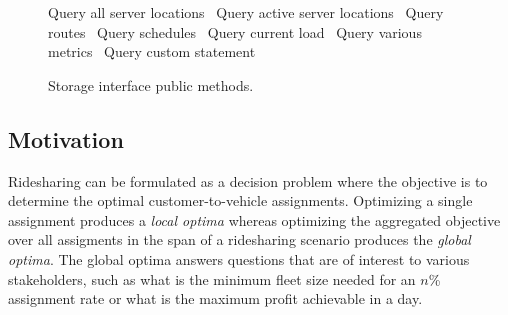 \documentclass{article}
\def\nwendcode{\endtrivlist \endgroup}
\let\nwdocspar=\par
\theoremstyle{definition}
\begin{document}
\begin{figure}
{\begin{minipage}[t]{0.40\textwidth}
\LA{}Query all server locations~{\nwtagstyle{}}\RA{}
\LA{}Query active server locations~{\nwtagstyle{}}\RA{}
\LA{}Query routes~{\nwtagstyle{}}\RA{}
\LA{}Query schedules~{\nwtagstyle{}}\RA{}
\LA{}Query current load~{\nwtagstyle{}}\RA{}
\LA{}Query various metrics~{\nwtagstyle{}}\RA{}
\LA{}Query custom statement~{\nwtagstyle{}}\RA{}
\nwendcode{}\nwdocspar
\end{minipage}
}
\caption{Storage interface public methods.}
\label{fig:methods}
\end{figure}

\subsection{Motivation}
\label{sec:motivation}
Ridesharing can be formulated as a decision problem where the objective is to
determine the optimal customer-to-vehicle assignments. Optimizing a single
assignment produces a \emph{local optima} whereas optimizing the aggregated
objective over all assigments in the span of a ridesharing scenario produces
the \emph{global optima}. The global optima answers questions that are of
interest to various stakeholders, such as what is the minimum fleet size needed
for an $n$\% assignment rate or what is the maximum profit achievable in a day.
\end{document}
